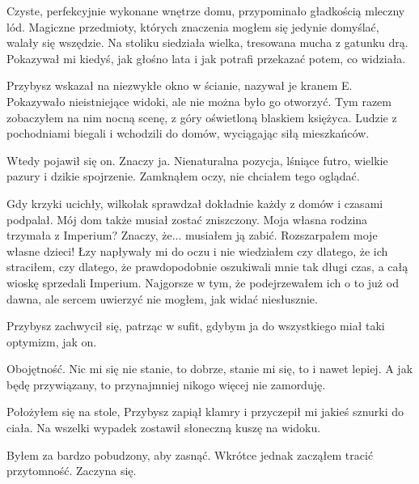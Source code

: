 Czyste, perfekcyjnie wykonane wnętrze domu, przypominało gładkością mleczny lód.
Magiczne przedmioty, których znaczenia mogłem się jedynie domyślać, walały się wszędzie.
Na stoliku siedziała wielka, tresowana mucha z gatunku drą. Pokazywał mi kiedyś, jak głośno lata i jak potrafi przekazać potem, co widziała.

Przybysz wskazał na niezwykłe okno w ścianie, nazywał je kranem E.
Pokazywało nieistniejące widoki, ale nie można było go otworzyć.
Tym razem zobaczyłem na nim nocną scenę, z góry oświetloną blaskiem księżyca. 
Ludzie z pochodniami biegali i wchodzili do domów, wyciągając siłą mieszkańców.

Wtedy pojawił się on. Znaczy ja.
Nienaturalna pozycja, lśniące futro, wielkie pazury i dzikie spojrzenie.
Zamknąłem oczy, nie chciałem tego oglądać.

Gdy krzyki ucichły, wilkołak sprawdzał dokładnie każdy z domów i czasami podpalał.
Mój dom także musiał zostać zniszczony. Moja własna rodzina trzymała z Imperium? 
Znaczy, że... musiałem ją zabić. Rozszarpałem moje własne dzieci!
Łzy napływały mi do oczu i nie wiedziałem czy dlatego, że ich straciłem, czy dlatego, że prawdopodobnie oszukiwali mnie tak długi czas, a całą wioskę sprzedali Imperium.
Najgorsze w tym, że podejrzewałem ich o to już od dawna, ale sercem uwierzyć nie mogłem, jak widać niesłusznie.

Przybysz zachwycił się, patrząc w sufit, gdybym ja do wszystkiego miał taki optymizm, jak on.

Obojętność.
Nic mi się nie stanie, to dobrze, stanie mi się, to i nawet lepiej.
A jak będę przywiązany, to przynajmniej nikogo więcej nie zamorduję.

Położyłem się na stole, Przybysz zapiął klamry i przyczepił mi jakieś sznurki do ciała.
Na wszelki wypadek zostawił słoneczną kuszę na widoku.

Byłem za bardzo pobudzony, aby zasnąć. Wkrótce jednak zacząłem tracić przytomność. Zaczyna się.

